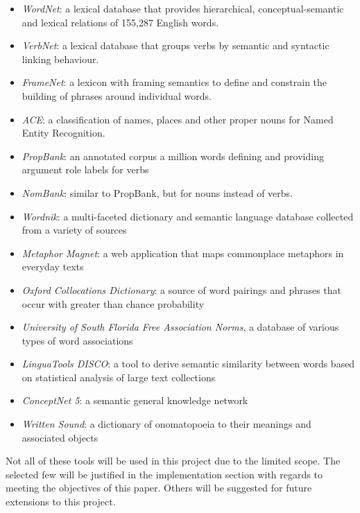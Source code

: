 \begin{itemize}
\item{\textit{WordNet}: a lexical database that provides hierarchical, conceptual-semantic and lexical relations of 155,287 English words.\cite{miller1995wordnet}}
\item{\textit{VerbNet}: a lexical database that groups verbs by semantic and syntactic linking behaviour.\cite{schuler2005verbnet}}
\item{\textit{FrameNet}: a lexicon with framing semantics to define and constrain the building of phrases around individual words.\cite{baker1998berkeley}}
\item{\textit{ACE}: a classification of names, places and other proper nouns for Named Entity Recognition.\cite{doddington2004automatic}}
\item{\textit{PropBank}: an annotated corpus a million words defining and providing argument role labels for verbs\cite{kingsbury2002treebank}}
\item{\textit{NomBank}: similar to PropBank, but for nouns instead of verbs.\cite{meyers2004nombank}}
\item{\textit{Wordnik}: a multi-faceted dictionary and semantic language database collected from a variety of sources\cite{wordnik}}
\item{\textit{Metaphor Magnet}: a web application that maps commonplace metaphors in everyday texts\cite{vealespecifying}}
\item{\textit{Oxford Collocations Dictionary}: a source of word pairings and phrases that occur with greater than chance probability\cite{crowther2003oxford}}
\item{\textit{University of South Florida Free Association Norms}, a database of various types of word associations\cite{nelson2004university}}
\item{\textit{LinguaTools DISCO}: a tool to derive semantic similarity between words based on statistical analysis of large text collections\cite{kolb2008disco}}
\item{\textit{ConceptNet 5}: a semantic general knowledge network\cite{liu2004conceptnet}}
\item{\textit{Written Sound}: a dictionary of onomatopoeia to their meanings and associated objects\cite{onomat}}
\end{itemize}

Not all of these tools will be used in this project due to the limited scope. The selected few will be justified in the implementation section with regards to meeting the objectives of this paper. Others will be suggested for future extensions to this project.

